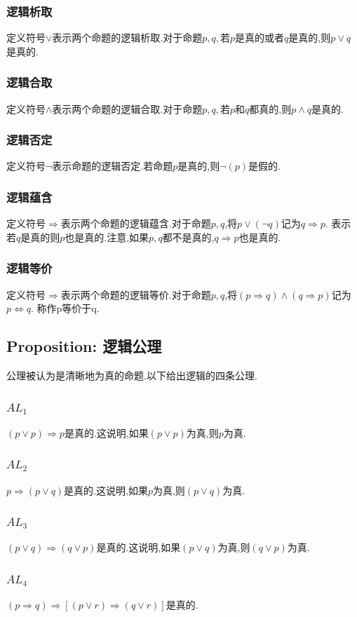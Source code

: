 \documentclass[12pt, a4paper, oneside]{ctexbook}
\begin{document}
  \subsubsection{逻辑析取}
  定义符号$\lor $表示两个命题的逻辑析取.对于命题$p,q,\text{若}p$是真的或者$q$是真的,则$p\lor q$是真的.
  \subsubsection{逻辑合取}
  定义符号$\land  $表示两个命题的逻辑合取.对于命题$p,q,\text{若}p$和$q$都真的,则$p\land q$是真的.
  \subsubsection{逻辑否定}
  定义符号$\lnot $表示命题的逻辑否定.若命题$p$是真的,则$\lnot(p)$是假的.
  \subsubsection{逻辑蕴含}
  定义符号$\Rightarrow$表示两个命题的逻辑蕴含.对于命题$p,q$,将$p\lor(\lnot q)$记为$q\Rightarrow p$.
  表示若$q$是真的则$p$也是真的.注意,如果$p,q$都不是真的,$q\Rightarrow p$也是真的.
  \subsubsection{逻辑等价}
  定义符号$\Rightarrow$表示两个命题的逻辑等价.对于命题$p,q$,将$(p\Rightarrow q)\land (q\Rightarrow p)$记为$p\Leftrightarrow q$.
  称作p等价于q.
  \subsection{Proposition: 逻辑公理}
  公理被认为是清晰地为真的命题.以下给出逻辑的四条公理.
  \subsubsection{$AL_1$}
  $(p\lor p)\Rightarrow p$是真的.这说明,如果$(p\lor p)$为真,则$p$为真.
  \subsubsection{$AL_2$}
  $p\Rightarrow (p\lor q)$是真的.这说明,如果$p$为真,则$(p\lor q)$为真.
  \subsubsection{$AL_3$}
  $(p\lor q)\Rightarrow (q\lor p)$是真的.这说明,如果$(p\lor q)$为真,则$(q\lor p)$为真.
  \subsubsection{$AL_4$}
  $(p\Rightarrow q)\Rightarrow [(p\lor r)\Rightarrow(q\lor r)]$是真的.
\end{document}
